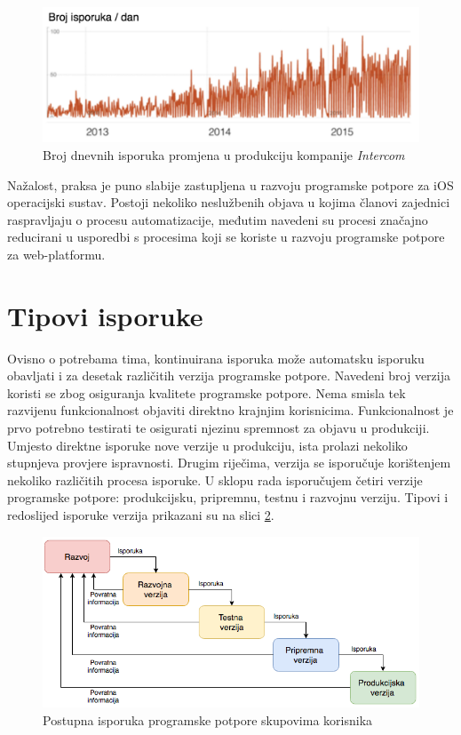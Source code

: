 \documentclass[times, utf8, diplomski, numeric]{fer}
\begin{document}
\begin{figure}
\centering
\includegraphics[scale=0.7]{IntercomShipsPerDay}
\caption{Broj dnevnih isporuka promjena u produkciju kompanije \textit{Intercom}}
\label{fig:IntercomShipsPerDay}
\end{figure}

Nažalost, praksa je puno slabije zastupljena u razvoju programske potpore za iOS operacijski sustav. Postoji nekoliko neslužbenih objava u kojima članovi zajednici raspravljaju o procesu automatizacije, međutim navedeni su procesi značajno reducirani u usporedbi s procesima koji se koriste u razvoju programske potpore za web-platformu.

\section{Tipovi isporuke}

Ovisno o potrebama tima, kontinuirana isporuka može automatsku isporuku obavljati i za desetak različitih verzija programske potpore. Navedeni broj verzija koristi se zbog osiguranja kvalitete programske potpore. Nema smisla tek razvijenu funkcionalnost objaviti direktno krajnjim korisnicima. Funkcionalnost je prvo potrebno testirati te osigurati njezinu spremnost za objavu u produkciji. Umjesto direktne isporuke nove verzije u produkciju, ista prolazi nekoliko stupnjeva provjere ispravnosti. Drugim riječima, verzija se isporučuje korištenjem nekoliko različitih procesa isporuke. U sklopu rada isporučujem četiri verzije programske potpore: produkcijsku, pripremnu, testnu i razvojnu verziju. Tipovi i redoslijed isporuke verzija prikazani su na slici \ref{fig:DeploymentStages}.

\begin{figure}[h]
\centering
\includegraphics[scale=0.6]{DeploymentStages}
\caption{Postupna isporuka programske potpore skupovima korisnika}
\label{fig:DeploymentStages}
\end{figure}
\end{document}
